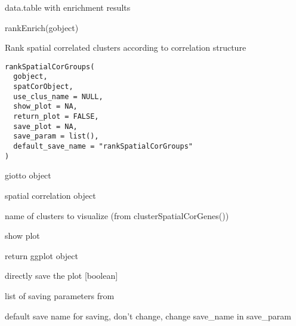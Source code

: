 \documentclass[a4paper]{book}
\begin{document}
%
\begin{Value}
data.table with enrichment results
\end{Value}
%
\begin{SeeAlso}\relax
{}
\end{SeeAlso}
%
\begin{Examples}
\begin{ExampleCode}
    rankEnrich(gobject)
\end{ExampleCode}
\end{Examples}
%
\begin{Description}\relax
Rank spatial correlated clusters according to correlation structure
\end{Description}
%
\begin{Usage}
\begin{verbatim}
rankSpatialCorGroups(
  gobject,
  spatCorObject,
  use_clus_name = NULL,
  show_plot = NA,
  return_plot = FALSE,
  save_plot = NA,
  save_param = list(),
  default_save_name = "rankSpatialCorGroups"
)
\end{verbatim}
\end{Usage}
%
\begin{Arguments}
\begin{ldescription}
\item[\code{gobject}] giotto object

\item[\code{spatCorObject}] spatial correlation object

\item[\code{use\_clus\_name}] name of clusters to visualize (from clusterSpatialCorGenes())

\item[\code{show\_plot}] show plot

\item[\code{return\_plot}] return ggplot object

\item[\code{save\_plot}] directly save the plot [boolean]

\item[\code{save\_param}] list of saving parameters from 

\item[\code{default\_save\_name}] default save name for saving, don't change, change save\_name in save\_param
\end{ldescription}
\end{Arguments}
\end{document}
